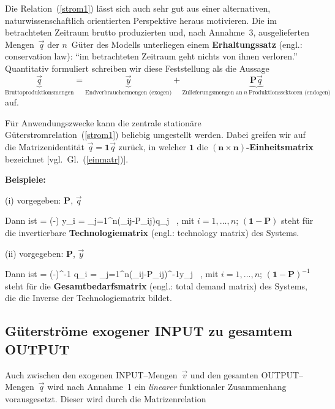 \medskip
\noindent
Die Relation~(\ref{strom1}) l\"asst sich auch sehr gut
aus einer alternativen, naturwissenschaftlich orientierten
Perspektive heraus motivieren. Die im
betrachteten Zeitraum brutto produzierten und, nach Annahme~3,
ausgelieferten Mengen~$\vec{q}$ der $n$~G\"uter
des Modells unterliegen einem {\bf Erhaltungssatz} (engl.: 
conservation law): "`im
betrachteten Zeitraum geht nichts von ihnen verloren."'
Quantitativ formuliert schreiben wir diese Feststellung
als die Aussage
%
\[
\underbrace{\vec{q}}_{\text{Bruttoproduktionsmengen}}
=\underbrace{\vec{y}}_{\text{Endverbrauchermengen (exogen)}}
+\underbrace{\mathbf{P}\vec{q}}_{\text{Zulieferungsmengen an}\ n
\ \text{Produktionssektoren (endogen)}}
\]
%
auf.

\medskip
\noindent
F\"ur Anwendungszwecke kann die zentrale station\"{a}re
G\"uterstromrelation~(\ref{strom1}) beliebig umgestellt werden.
Dabei greifen wir auf die Matrizenidentit\"at
$\vec{q}=\mathbf{1}\vec{q}$ zur\"uck, in welcher $\mathbf{1}$ die
$\boldsymbol{(n \times n)}${\bf -Einheitsmatrix} bezeichnet
[vgl.\ Gl.~(\ref{einmatr})].


\noindent
{\bf Beispiele:}

\medskip
\noindent
(i) vorgegeben: $\mathbf{P}$, $\vec{q}$

\medskip
\noindent
Dann ist
%
\be
{}
 = (-)
\quad \Leftrightarrow \quad
y_{i} = \sum_{j=1}^{n}(\delta_{ij}-P_{ij})q_{j} \ ,
\ee
%
mit $i = 1, \ldots, n$; $(\mathbf{1}-\mathbf{P})$ steht f\"ur
die invertierbare {\bf Technologiematrix} (engl.: technology 
matrix) des Systems.

\medskip
\noindent
(ii) vorgegeben: $\mathbf{P}$, $\vec{y}$

\medskip
\noindent
Dann ist
%
\be
{}
 = (-)^{-1}
\quad \Leftrightarrow \quad
q_{i} = \sum_{j=1}^{n}(\delta_{ij}-P_{ij})^{-1}y_{j} \ ,
\ee
%
mit $i = 1, \ldots, n$; $(\mathbf{1}-\mathbf{P})^{-1}$ steht f\"ur
die {\bf Gesamtbedarfsmatrix} (engl.: total demand matrix) des 
Systems, die die Inverse der Technologiematrix bildet.

\subsection{G\"uterstr\"ome exogener INPUT zu gesamtem OUTPUT}
Auch zwischen den exogenen INPUT--Mengen~$\vec{v}$ und den gesamten
OUTPUT--Mengen~$\vec{q}$ wird nach Annahme~1 ein {\em linearer\/}
funktionaler Zusammenhang vorausgesetzt. Dieser wird durch die
Matrizenrelation

